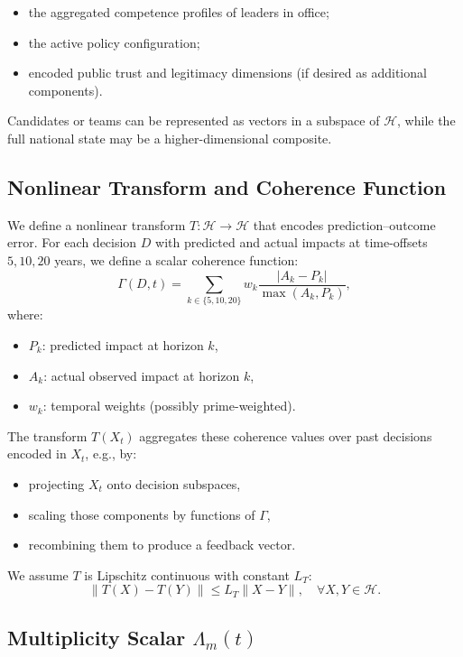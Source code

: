 \documentclass[11pt]{article}
\begin{document}
\begin{itemize}[leftmargin=1.5em]
    \item the aggregated competence profiles of leaders in office;
    \item the active policy configuration;
    \item encoded public trust and legitimacy dimensions (if desired as additional components).
\end{itemize}

Candidates or teams can be represented as vectors in a subspace of \(\mathcal{H}\), while the full national state may be a higher-dimensional composite.

\subsection{Nonlinear Transform and Coherence Function}

We define a nonlinear transform \(T: \mathcal{H} \to \mathcal{H}\) that encodes prediction--outcome error. For each decision \(D\) with predicted and actual impacts at time-offsets \(5,10,20\) years, we define a scalar coherence function:
\[
  \Gamma(D, t) =
    \sum_{k \in \{5,10,20\}} w_k \frac{|A_k - P_k|}{\max(A_k, P_k)},
\]
where:
\begin{itemize}[leftmargin=1.5em]
    \item \(P_k\): predicted impact at horizon \(k\),
    \item \(A_k\): actual observed impact at horizon \(k\),
    \item \(w_k\): temporal weights (possibly prime-weighted).
\end{itemize}

The transform \(T(X_t)\) aggregates these coherence values over past decisions encoded in \(X_t\), e.g., by:

\begin{itemize}[leftmargin=1.5em]
    \item projecting \(X_t\) onto decision subspaces,
    \item scaling those components by functions of \(\Gamma\),
    \item recombining them to produce a feedback vector.
\end{itemize}

We assume \(T\) is Lipschitz continuous with constant \(L_T\):
\[
  \|T(X) - T(Y)\| \leq L_T \|X - Y\|,\quad \forall X,Y \in \mathcal{H}.
\]

\subsection{Multiplicity Scalar \(\Lambda_m(t)\)}
\end{document}
